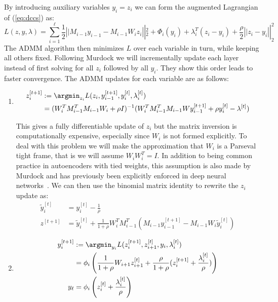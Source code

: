 By introducing auxiliary variables $y_i = z_i$ we can form the augmented Lagrangian of (\ref{eq:dccs}) as:
\begin{equation}
  L(z, y, \lambda) = \sum_{i=1}^{\ell} \frac{1}{2} \left|| M_{i-1}y_{i-1} - M_{i-1}W_iz_i\right||_2^2 + \Phi_i(y_i) + \lambda^T_i(z_i - y_i) + \frac{\rho}{2}\left||z_i - y_i\right||_2^2
\end{equation}
The ADMM algorithm then minimizes $L$ over each variable in turn, while keeping all others fixed. Following Murdock \etal we will incrementally update each layer instead of first solving for all $z_i$ followed by all $y_i$. They show this order leads to faster convergence. The ADMM updates for each variable are as follows:
\begin{enumerate}
\item
  \begin{equation}
    \begin{aligned}
      z^{[t+1]}_i &:= \argmin_{z_i} L(z_i, y^{[t+1]}_{i-1}, y^{[t]}_i, \lambda_i^{[t]})\\
      &= (W_i^TM_{i-1}^TM_{i-1}W_i + \rho I)^{-1}(W_{i}^TM_{i-1}^TM_{i-1}Wy^{[t+1]}_{i-1} + \rho y^{[t]}_{i} - \lambda^{[t]})
    \end{aligned}
    \label{eq:wupdate1}  
  \end{equation}

  This gives a fully differentiable update of $z_i$ but the matrix inversion is computationally expensive, especially since $W_i$ is not formed explicitly. To deal with this problem we will make the approximation that $W_i$ is a Parseval tight frame, that is we will assume $W_iW_i^T = I$. In addition to being common practice in autoencoders with tied weights, this assumption is also made by Murdock \etal and has previously been explicitly enforced in deep neural networks~\cite{moustapha}. We can then use the binomial matrix identity to rewrite the $z_i$ update as:
  \begin{equation}
    \begin{aligned}
      \tilde{y}_i^{[t]} &= y_i^{[t]} - \frac{1}{\rho}\\
      z^{[t+1]} &= \tilde{y}_i^{[t]} + \frac{1}{1 + \rho}W^T_iM_{i-1}^T(M_{i-1}y^{[t+1]}_{i-1} - M_{i-1}W_i\tilde{y}^{[t]}_i)
    \end{aligned}\label{eq:zupdate}
  \end{equation}
\item
  \begin{equation}
    \begin{aligned}
      y_i^{[t+1]} &:= \argmin_{y_i} L(z^{[t+1]}_i, z^{[t]}_{i+1}, y_i, \lambda_i^{[t]})\\
      &= \phi_i\left(\frac{1}{1+\rho}W_{i+1}z^{[t]}_{i+1} + \frac{\rho}{1+\rho}(z^{[t+1]}_i + \frac{\lambda_i^{[t]}}{\rho})\right)\\
      y_{\ell} &= \phi_i\left(z_i^{[t]} + \frac{\lambda_i^{[t]}}{\rho}\right)
    \end{aligned}\label{eq:yupdate}
  \end{equation}


\end{enumerate}
